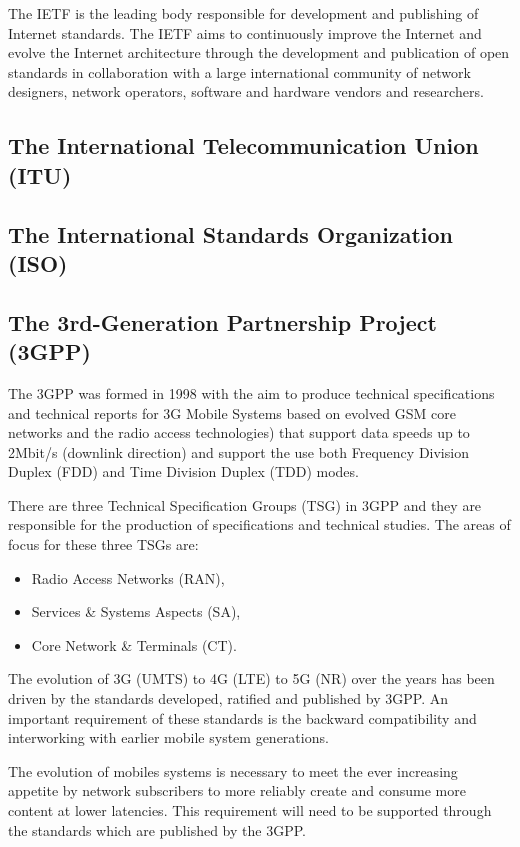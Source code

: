 The IETF is the leading body responsible for development and publishing of Internet standards. The IETF aims to continuously improve the Internet and evolve the Internet architecture through the development and publication of open standards in collaboration with a large international community of network designers, network operators, software and hardware vendors and researchers. 

\subsection{The International Telecommunication Union (ITU)}\label{ITU}



\subsection{The International Standards Organization (ISO)}

\subsection{The 3rd-Generation Partnership Project (3GPP)}

The 3GPP was formed in 1998 with the aim to produce technical specifications and technical reports for 3G Mobile Systems based on evolved GSM core networks and the radio access technologies) that support data speeds up to 2Mbit/s (downlink direction) and support the use both Frequency Division Duplex (FDD) and Time Division Duplex (TDD) modes. 

There are three Technical Specification Groups (TSG) in 3GPP and they are responsible for the production of specifications and technical studies. The areas of focus for these three TSGs are:

\begin{itemize}
\item Radio Access Networks (RAN),
\item Services & Systems Aspects (SA),
\item Core Network & Terminals (CT).
\end{itemize} 

The evolution of 3G (UMTS) to 4G (LTE) to 5G (NR) over the years has been driven by the standards developed, ratified and published by 3GPP. An important requirement of these standards is the backward compatibility and interworking with earlier mobile system generations. 

The evolution of mobiles systems is necessary to meet the ever increasing appetite by network subscribers to more reliably create and consume more content at lower latencies.  This requirement will need to be supported through the standards which are published by the 3GPP.    

